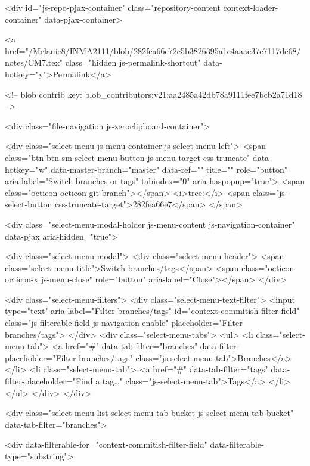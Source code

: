         <div id="js-repo-pjax-container" class="repository-content context-loader-container" data-pjax-container>
          

<a href="/Melanie8/INMA2111/blob/282fea66e72c5b3826395a1e4aaac37c7117de68/notes/CM7.tex" class="hidden js-permalink-shortcut" data-hotkey="y">Permalink</a>

<!-- blob contrib key: blob_contributors:v21:aa2485a42db78a9111fee7bcb2a71d18 -->

<div class="file-navigation js-zeroclipboard-container">
  
<div class="select-menu js-menu-container js-select-menu left">
  <span class="btn btn-sm select-menu-button js-menu-target css-truncate" data-hotkey="w"
    data-master-branch="master"
    data-ref=""
    title=""
    role="button" aria-label="Switch branches or tags" tabindex="0" aria-haspopup="true">
    <span class="octicon octicon-git-branch"></span>
    <i>tree:</i>
    <span class="js-select-button css-truncate-target">282fea66e7</span>
  </span>

  <div class="select-menu-modal-holder js-menu-content js-navigation-container" data-pjax aria-hidden="true">

    <div class="select-menu-modal">
      <div class="select-menu-header">
        <span class="select-menu-title">Switch branches/tags</span>
        <span class="octicon octicon-x js-menu-close" role="button" aria-label="Close"></span>
      </div>

      <div class="select-menu-filters">
        <div class="select-menu-text-filter">
          <input type="text" aria-label="Filter branches/tags" id="context-commitish-filter-field" class="js-filterable-field js-navigation-enable" placeholder="Filter branches/tags">
        </div>
        <div class="select-menu-tabs">
          <ul>
            <li class="select-menu-tab">
              <a href="#" data-tab-filter="branches" data-filter-placeholder="Filter branches/tags" class="js-select-menu-tab">Branches</a>
            </li>
            <li class="select-menu-tab">
              <a href="#" data-tab-filter="tags" data-filter-placeholder="Find a tag…" class="js-select-menu-tab">Tags</a>
            </li>
          </ul>
        </div>
      </div>

      <div class="select-menu-list select-menu-tab-bucket js-select-menu-tab-bucket" data-tab-filter="branches">

        <div data-filterable-for="context-commitish-filter-field" data-filterable-type="substring">


